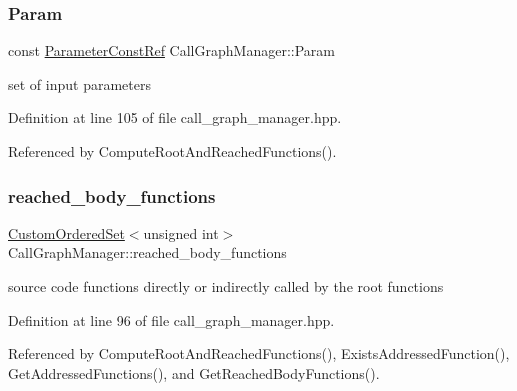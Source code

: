\subsubsection{\texorpdfstring{Param}{Param}}
{\footnotesize\ttfamily const \hyperlink{Parameter_8hpp_a37841774a6fcb479b597fdf8955eb4ea}{Parameter\+Const\+Ref} Call\+Graph\+Manager\+::\+Param\hspace{0.3cm}{\ttfamily [private]}}



set of input parameters 



Definition at line 105 of file call\+\_\+graph\+\_\+manager.\+hpp.



Referenced by Compute\+Root\+And\+Reached\+Functions().

\mbox{\label{classCallGraphManager_a0416ed0f6be715340b059302d46b2d63}} 
\subsubsection{\texorpdfstring{reached\+\_\+body\+\_\+functions}{reached\_body\_functions}}
{\footnotesize\ttfamily \hyperlink{classCustomOrderedSet}{Custom\+Ordered\+Set}$<$unsigned int$>$ Call\+Graph\+Manager\+::reached\+\_\+body\+\_\+functions\hspace{0.3cm}{\ttfamily [private]}}



source code functions directly or indirectly called by the root functions 



Definition at line 96 of file call\+\_\+graph\+\_\+manager.\+hpp.



Referenced by Compute\+Root\+And\+Reached\+Functions(), Exists\+Addressed\+Function(), Get\+Addressed\+Functions(), and Get\+Reached\+Body\+Functions().

\mbox{\label{classCallGraphManager_a37bdf97b52e3503e6c8b7f28f54d11ef}} 
